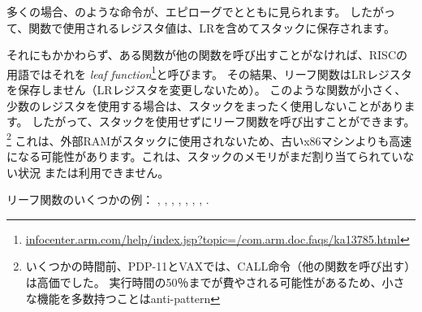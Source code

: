 多くの場合、のような命令が、エピローグでとともに見られます。
したがって、関数で使用されるレジスタ値は、\ac{LR}を含めてスタックに保存されます。

それにもかかわらず、ある関数が他の関数を呼び出すことがなければ、\ac{RISC}の用語ではそれを
\emph{\gls{leaf function}}\footnote{\href{http://go.yurichev.com/17064}{infocenter.arm.com/help/index.jsp?topic=/com.arm.doc.faqs/ka13785.html}}と呼びます。
その結果、リーフ関数は\ac{LR}レジスタを保存しません（\ac{LR}レジスタを変更しないため）。 
このような関数が小さく、少数のレジスタを使用する場合は、スタックをまったく使用しないことがあります。 
したがって、スタックを使用せずにリーフ関数を呼び出すことができます。
\footnote{いくつかの時間前、PDP-11とVAXでは、CALL命令（他の関数を呼び出す）は高価でした。 
実行時間の50％までが費やされる可能性があるため、小さな機能を多数持つことは\gls{anti-pattern} }
これは、外部RAMがスタックに使用されないため、古いx86マシンよりも高速になる可能性があります。これは、スタックのメモリがまだ割り当てられていない状況 または利用できません。

リーフ関数のいくつかの例：
, , 
, , ,
, , .
